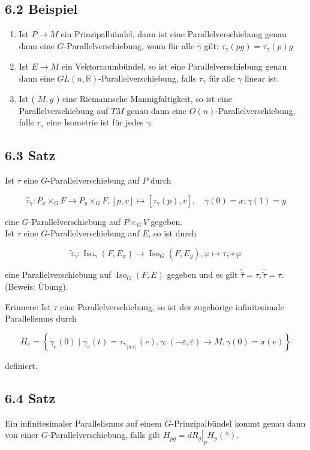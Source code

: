 \subsection*{6.2 Beispiel}
\begin{enumerate}
  \item Ist $P \rightarrow M$ ein Prinzipalbündel, dann ist eine Parallelverschiebung genau dann eine $G$-Parallelverschiebung, wenn für alle $\gamma$ gilt: $\tau_{\gamma}(p g)=\tau_{\gamma}(p) g$
  \item Ist $E \rightarrow M$ ein Vektorraumbündel, so ist eine Parallelverschiebung genau dann eine $G L(n, \mathbb{R})$-Parallelverschiebung, falls $\tau_{\gamma}$ für alle $\gamma$ linear ist.
  \item Ist ( $M, g$ ) eine Riemannsche Mannigfaltigkeit, so ist eine Parallelverschiebung auf $T M$ genau dann eine $O(n)$-Parallelverschiebung, falls $\tau_{\gamma}$ eine Isometrie ist für jedes $\gamma$.
\end{enumerate}

\subsection*{6.3 Satz}
Ist $\tau$ eine $G$-Parallelverschiebung auf $P$ durch

$$
\hat{\tau}_{\gamma}: P_{x} \times_{G} F \rightarrow P_{y} \times_{G} F,[p, v] \mapsto\left[\tau_{\gamma}(p), v\right], \quad \gamma(0)=x ; \gamma(1)=y
$$

eine $G$-Parallelverschiebung auf $P \times_{G} V$ gegeben.\\
Ist $\tau$ eine $G$-Parallelverschiebung auf $E$, so ist durch

$$
\tilde{\tau}_{\gamma}: \operatorname{Iso}_{\gamma}\left(F, E_{x}\right) \rightarrow \operatorname{Iso}_{G}\left(F, E_{y}\right), \varphi \mapsto \tau_{\gamma} \circ \varphi
$$

eine Parallelverschiebung auf $\operatorname{Iso}_{G}(F, E)$ gegeben und es gilt $\tilde{\hat{\tau}}=\tau, \hat{\tilde{\tau}}=\tau$. (Beweis: Übung).

Erinnere: Ist $\tau$ eine Parallelverschiebung, so ist der zugehörige infinitesimale Parallelismus durch

$$
H_{e}=\left\{\dot{\gamma}_{e}(0) \mid \gamma_{e}(t)=\tau_{\gamma_{[0 ; t]}}(e), \gamma:(-\varepsilon, \varepsilon) \rightarrow M, \gamma(0)=\pi(e)\right\}
$$

definiert.

\subsection*{6.4 Satz}
Ein infinitesimaler Parallelismus auf einem $G$-Prinzipalbündel kommt genau dann von einer $G$-Parallelverschiebung, falls gilt $H_{p g}=\left.d R_{g}\right|_{p} H_{p}(*)$.

